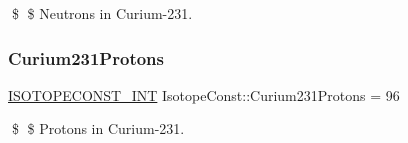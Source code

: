 \$ \$ Neutrons in Curium-\/231. \mbox{\label{group___isotope_const-_curium-_cm231_gaa64122957f5b7777a4a08798ec806cfe}} 
\subsubsection{\texorpdfstring{Curium231\+Protons}{Curium231Protons}}
{\footnotesize\ttfamily \mbox{\hyperlink{group___isotope_const-_macros_ga5f18360b3e99483a35c32d789e62621c}{I\+S\+O\+T\+O\+P\+E\+C\+O\+N\+S\+T\+\_\+\+I\+NT}} Isotope\+Const\+::\+Curium231\+Protons = 96}

\$ \$ Protons in Curium-\/231. 